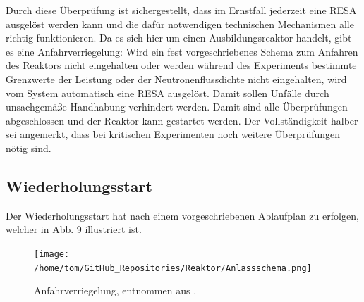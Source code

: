 \documentclass[german,  %
parskip=full,  %
]{scrartcl}
\begin{document}
Durch diese Überprüfung ist sichergestellt, dass im Ernstfall jederzeit eine RESA ausgelöst werden kann und die dafür notwendigen technischen Mechanismen alle richtig funktionieren. Da es sich hier um einen Ausbildungsreaktor handelt, gibt es eine Anfahrverriegelung: Wird ein fest vorgeschriebenes Schema zum Anfahren des Reaktors nicht eingehalten oder werden während des Experiments bestimmte Grenzwerte der Leistung oder der Neutronenflussdichte nicht eingehalten, wird vom System automatisch eine RESA ausgelöst. Damit sollen Unfälle durch unsachgemäße Handhabung verhindert werden. Damit sind alle Überprüfungen abgeschlossen und der Reaktor kann gestartet werden. Der Vollständigkeit halber sei angemerkt, dass bei kritischen Experimenten noch weitere Überprüfungen nötig sind.
\subsection{Wiederholungsstart}
Der Wiederholungsstart hat nach einem vorgeschriebenen Ablaufplan zu erfolgen, welcher in Abb. 9 illustriert ist.
\newpage


\begin{figure}[h!]\centering
\texttt{[image: /home/tom/GitHub\_Repositories/Reaktor/Anlassschema.png]}
\caption{Anfahrverriegelung, entnommen aus \cite{4}.}
\end{figure}
\end{document}
